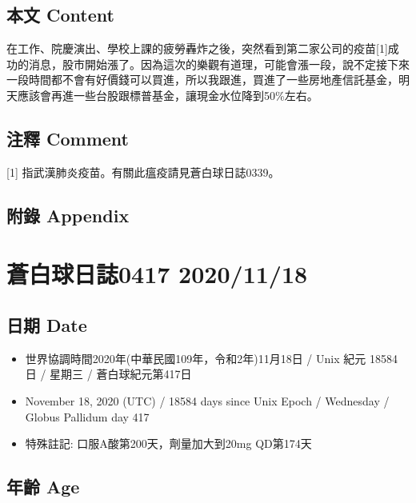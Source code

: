 \documentclass[a5paper, 11pt
]{book}
\providecommand{\tightlist}{%
  \setlength{\itemsep}{0pt}\setlength{\parskip}{0pt}}
\begin{document}
\hypertarget{ux672cux6587-content-70}{%
\subsection{本文 Content}\label{ux672cux6587-content-70}}

在工作、院慶演出、學校上課的疲勞轟炸之後，突然看到第二家公司的疫苗{[}1{]}成功的消息，股市開始漲了。因為這次的樂觀有道理，可能會漲一段，說不定接下來一段時間都不會有好價錢可以買進，所以我跟進，買進了一些房地產信託基金，明天應該會再進一些台股跟標普基金，讓現金水位降到50\%左右。

\hypertarget{ux6ce8ux91cb-comment-70}{%
\subsection{注釋 Comment}\label{ux6ce8ux91cb-comment-70}}

{[}1{]} 指武漢肺炎疫苗。有關此瘟疫請見蒼白球日誌0339。

\hypertarget{ux9644ux9304-appendix-70}{%
\subsection{附錄 Appendix}\label{ux9644ux9304-appendix-70}}

\hypertarget{ux84bcux767dux7403ux65e5ux8a8c0417-20201118}{%
\section{蒼白球日誌0417
2020/11/18}\label{ux84bcux767dux7403ux65e5ux8a8c0417-20201118}}

\hypertarget{ux65e5ux671f-date-71}{%
\subsection{日期 Date}\label{ux65e5ux671f-date-71}}

\begin{itemize}
\tightlist
\item
  世界協調時間2020年(中華民國109年，令和2年)11月18日 / Unix 紀元 18584
  日 / 星期三 / 蒼白球紀元第417日
\item
  November 18, 2020 (UTC) / 18584 days since Unix Epoch / Wednesday /
  Globus Pallidum day 417
\item
  特殊註記: 口服A酸第200天，劑量加大到20mg QD第174天
\end{itemize}

\hypertarget{ux5e74ux9f61-age-71}{%
\subsection{年齡 Age}\label{ux5e74ux9f61-age-71}}
\end{document}
